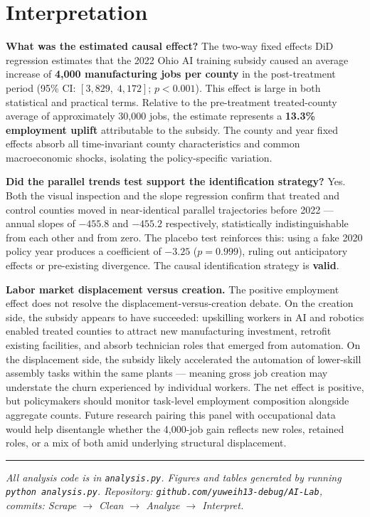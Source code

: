 \documentclass[12pt]{article}
\begin{document}
\section{Interpretation}
\label{sec:interpret}

\textbf{What was the estimated causal effect?}
The two-way fixed effects DiD regression estimates that the 2022 Ohio AI training subsidy
caused an average increase of \textbf{4,000 manufacturing jobs per county} in the
post-treatment period (95\% CI: $[3{,}829,\; 4{,}172]$; $p < 0.001$). This effect is
large in both statistical and practical terms. Relative to the pre-treatment treated-county
average of approximately 30,000 jobs, the estimate represents a \textbf{13.3\% employment
uplift} attributable to the subsidy. The county and year fixed effects absorb all
time-invariant county characteristics and common macroeconomic shocks, isolating the
policy-specific variation.

\textbf{Did the parallel trends test support the identification strategy?}
Yes. Both the visual inspection and the slope regression confirm that treated and control
counties moved in near-identical parallel trajectories before 2022 --- annual slopes of
$-455.8$ and $-455.2$ respectively, statistically indistinguishable from each other and
from zero. The placebo test reinforces this: using a fake 2020 policy year produces a
coefficient of $-3.25$ ($p = 0.999$), ruling out anticipatory effects or pre-existing
divergence. The causal identification strategy is \textbf{valid}.

\textbf{Labor market displacement versus creation.}
The positive employment effect does not resolve the displacement-versus-creation debate.
On the creation side, the subsidy appears to have succeeded: upskilling workers in AI and
robotics enabled treated counties to attract new manufacturing investment, retrofit existing
facilities, and absorb technician roles that emerged from automation. On the displacement
side, the subsidy likely accelerated the automation of lower-skill assembly tasks within
the same plants --- meaning gross job creation may understate the churn experienced by
individual workers. The net effect is positive, but policymakers should monitor task-level
employment composition alongside aggregate counts. Future research pairing this panel with
occupational data would help disentangle whether the 4,000-job gain reflects new roles,
retained roles, or a mix of both amid underlying structural displacement.

\vspace{2em}\hrule\vspace{0.5em}
\footnotesize
\textit{All analysis code is in \texttt{analysis.py}. Figures and tables generated by
running \texttt{python analysis.py}. Repository: \texttt{github.com/yuweih13-debug/AI-Lab},
commits: Scrape $\to$ Clean $\to$ Analyze $\to$ Interpret.}
\end{document}
